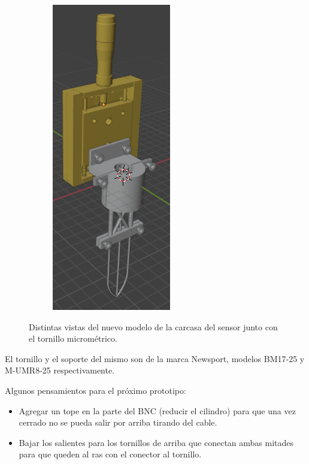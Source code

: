 \begin{figure}[!ht]
\begin{minipage}[c]{0.49\textwidth}
\begin{subfigure}{\textwidth}
					\includegraphics[height=1.30253508\textwidth]{Figures/21_04_2025/Vista_3_4_conector_y_sensor}
					\captionsetup{width=0.8\textwidth}
				\end{subfigure}
		\end{minipage}
	\caption{Distintas vistas del nuevo modelo de la carcasa del sensor junto con el tornillo micrométrico.} %
	\label{fig:Prototipo_4_carcasa_sensor}
\end{figure}

El tornillo y el soporte del mismo son de la marca Newsport, modelos BM17-25 y M-UMR8-25 respectivamente.

Algunos pensamientos para el próximo prototipo: 
\begin{itemize}
	\item Agregar un tope en la parte del BNC (reducir el cilindro) para que una vez cerrado no se pueda salir por arriba tirando del cable.
	\item Bajar los salientes para los tornillos de arriba que conectan ambas mitades para que queden al ras con el conector al tornillo.
\end{itemize}



